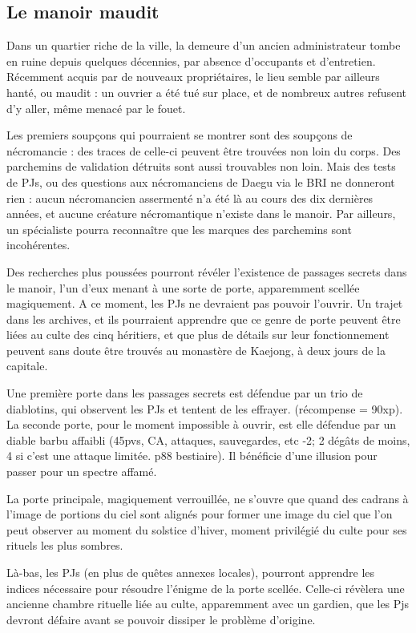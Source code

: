 \documentclass[10pt,a4paper]{book}
\begin{document}
\subsection{Le manoir maudit}
Dans un quartier riche de la ville, la demeure d'un ancien administrateur tombe en ruine depuis quelques décennies, par absence d'occupants et d'entretien. Récemment acquis par de nouveaux propriétaires, le lieu semble par ailleurs hanté, ou maudit : un ouvrier a été tué sur place, et de nombreux autres refusent d'y aller, même menacé par le fouet.

Les premiers soupçons qui pourraient se montrer sont des soupçons de nécromancie : des traces de celle-ci peuvent être trouvées non loin du corps. Des parchemins de validation détruits sont aussi trouvables non loin. Mais des tests de PJs, ou des questions aux nécromanciens de Daegu via le BRI ne donneront rien : aucun nécromancien assermenté n'a été là au cours des dix dernières années, et aucune créature nécromantique n'existe dans le manoir. Par ailleurs, un spécialiste pourra reconnaître que les marques des parchemins sont incohérentes.

Des recherches plus poussées pourront révéler l'existence de passages secrets dans le manoir, l'un d'eux menant à une sorte de porte, apparemment scellée magiquement. A ce moment, les PJs ne devraient pas pouvoir l'ouvrir. Un trajet dans les archives, et ils pourraient apprendre que ce genre de porte peuvent être liées au culte des cinq héritiers, et que plus de détails sur leur fonctionnement peuvent sans doute être trouvés au monastère de Kaejong, à deux jours de la capitale. 

Une première porte dans les passages secrets est défendue par un trio de diablotins, qui observent les PJs et tentent de les effrayer. (récompense = 90xp). La seconde porte, pour le moment impossible à ouvrir, est elle défendue par un diable barbu affaibli (45pvs, CA, attaques, sauvegardes, etc -2; 2 dégâts de moins, 4 si c'est une attaque limitée. p88 bestiaire). Il bénéficie d'une illusion pour passer pour un spectre affamé.

La porte principale, magiquement verrouillée, ne s'ouvre que quand des cadrans à l'image de portions du ciel sont alignés pour former une image du ciel que l'on peut observer au moment du solstice d'hiver, moment privilégié du culte pour ses rituels les plus sombres.

Là-bas, les PJs (en plus de quêtes annexes locales), pourront apprendre les indices nécessaire pour résoudre l'énigme de la porte scellée. Celle-ci révèlera une ancienne chambre rituelle liée au culte, apparemment avec un gardien, que les Pjs devront défaire avant se pouvoir dissiper le problème d'origine.
\end{document}
